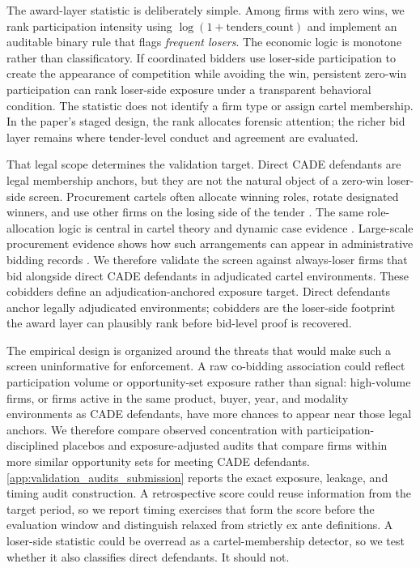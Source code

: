 The award-layer statistic is deliberately simple. Among firms
with zero wins, we rank participation intensity using
$\log(1+\text{tenders\_count})$ and implement an auditable
binary rule that flags \emph{frequent losers}. The economic
logic is monotone rather than classificatory. If coordinated
bidders use loser-side participation to create the appearance of
competition while avoiding the win, persistent zero-win
participation can rank loser-side exposure under a transparent
behavioral condition. The statistic does not identify a firm
type or assign cartel membership. In the paper's staged design,
the rank allocates forensic attention; the richer bid layer
remains where tender-level conduct and agreement are evaluated.

That legal scope determines the validation target. Direct CADE
defendants are legal membership anchors, but they are not the
natural object of a zero-win loser-side screen. Procurement
cartels often allocate winning roles, rotate designated
winners, and use other firms on the losing side of the tender
\citep{pesendorfer2000study,asker2010leniency}. The same
role-allocation logic is central in cartel theory and dynamic
case evidence \citep{marshall2012economics,clark2021collusion}.
Large-scale
procurement evidence shows how such arrangements can appear in
administrative bidding records \citep{kawai2022detecting}.
We therefore
validate the screen against always-loser firms that bid
alongside direct CADE defendants in adjudicated cartel
environments. These cobidders define an adjudication-anchored
exposure target. Direct defendants anchor legally adjudicated
environments; cobidders are the loser-side footprint the award
layer can plausibly rank before bid-level proof is recovered.

The empirical design is organized around the threats that would
make such a screen uninformative for enforcement. A raw
co-bidding association could reflect participation volume or
opportunity-set exposure rather than signal: high-volume firms,
or firms active in the same product, buyer, year, and modality
environments as CADE defendants, have more chances to appear
near those legal anchors. We therefore compare observed
concentration with participation-disciplined placebos and
exposure-adjusted audits that compare firms within more similar
opportunity sets for meeting CADE defendants. \ref{app:validation_audits_submission}
reports the exact
exposure, leakage, and timing audit construction. A
retrospective score could reuse information from the target
period, so we report timing exercises that form the score before
the evaluation window and distinguish relaxed from strictly ex
ante definitions. A loser-side statistic could be overread as a
cartel-membership detector, so we test whether it also
classifies direct defendants. It should not.

